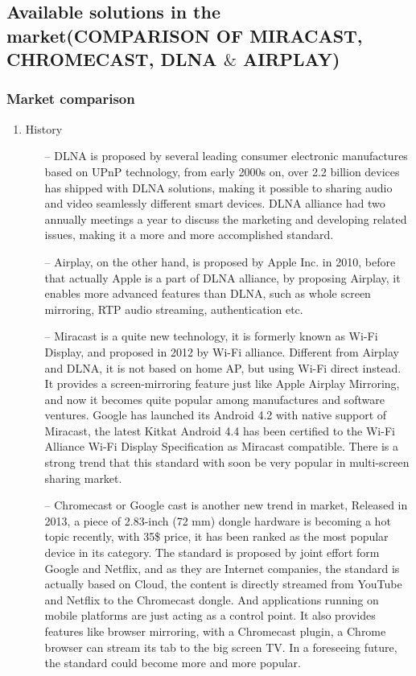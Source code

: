 \subsection*{Available solutions in the market(COMPARISON OF MIRACAST, CHROMECAST, DLNA $\&$ AIRPLAY)}

\subsubsection*{Market comparison}

\begin{enumerate}
\item History
\begin{itemize}
\item[--]DLNA is proposed by several leading consumer electronic manufactures based on UPnP technology, from early 2000s on, over 2.2 billion devices has shipped with DLNA solutions, making it possible to sharing audio and video seamlessly different smart devices. DLNA alliance had two annually meetings a year to discuss the marketing and developing related issues, making it a more and more accomplished standard.
\item[--]Airplay, on the other hand, is proposed by Apple Inc. in 2010, before that actually Apple is a part of DLNA alliance, by proposing Airplay, it enables more advanced features than DLNA, such as whole screen mirroring, RTP audio streaming, authentication etc.
\item[--]Miracast is a quite new technology, it is formerly known as Wi-Fi Display, and proposed in 2012 by Wi-Fi alliance. Different from Airplay and DLNA, it is not based on home AP, but using Wi-Fi direct instead. It provides a screen-mirroring feature just like Apple Airplay Mirroring, and now it becomes quite popular among manufactures and software ventures. Google has launched its Android 4.2 with native support of Miracast, the latest Kitkat Android 4.4 has been certified to the Wi-Fi Alliance Wi-Fi Display Specification as Miracast compatible. There is a strong trend that this standard with soon be very popular in multi-screen sharing market.
\item[--]Chromecast or Google cast is another new trend in market, Released in 2013, a piece of 2.83-inch (72 mm) dongle hardware is becoming a hot topic recently, with 35\$ price, it has been ranked as the most popular device in its category. The standard is proposed by joint effort form Google and Netflix, and as they are Internet companies, the standard is actually based on Cloud, the content is directly streamed from YouTube and Netflix to the Chromecast dongle. And applications running on mobile platforms are just acting as a control point. It also provides features like browser mirroring, with a Chromecast plugin, a Chrome browser can stream its tab to the big screen TV. In a foreseeing future, the standard could become more and more popular.

\end{itemize}
\end{enumerate}
